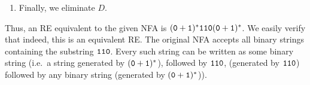 \begin{Example}
\begin{enumerate}
\item Finally, we eliminate $D$.
\begin{center}
\end{center}
\end{enumerate}
Thus, an RE equivalent to the given NFA is $(\texttt 0 + \texttt 1)^* \texttt 1\texttt 1\texttt 0 (\texttt 0 + \texttt 1)^*$. We easily verify that indeed, this is an equivalent RE. The original NFA accepts all binary strings containing the substring $\texttt 1\texttt 1\texttt 0$. Every such string can be written as some binary string (i.e.\ a string generated by $(\texttt 0 + \texttt 1)^*$), followed by $\texttt 1\texttt 1\texttt 0$, (generated by $\texttt 1\texttt 1\texttt 0$) followed by any binary string (generated by $(\texttt 0 + \texttt 1)^*$)).
\end{Example}

